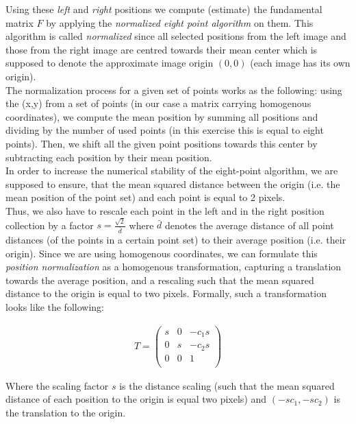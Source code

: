 \documentclass{paper}
\begin{document}
Using these \emph{left} and \emph{right} positions we compute (estimate) the fundamental matrix $F$ by applying the \emph{normalized eight point algorithm} on them. This algorithm is called \emph{normalized} since all selected positions from the left image and those from the right image are centred towards their mean center which is supposed to denote the approximate image origin $(0,0)$ (each image has its own origin). \\ 

The normalization process for a given set of points works as the following: using the (x,y) from a set of points (in our case a matrix carrying homogenous coordinates), we compute the mean position by summing all positions and dividing by the number of used points (in this exercise this is equal to eight points). Then, we shift all the given point positions towards this center by subtracting each position by their mean position. \\

In order to increase the numerical stability of the eight-point algorithm, we are supposed to ensure, that the mean squared distance between the origin (i.e. the mean position of the point set) and each point is equal to 2 pixels. \\

Thus, we also have to rescale each point in the left and in the right position collection by a factor $s = \frac{\sqrt{2}}{\bar{d}}$ where $\bar{d}$ denotes the average distance of all point distances (of the points in a certain point set) to their average position (i.e. their origin). Since we are using homogenous coordinates, we can formulate this \emph{position normalization} as a homogenous transformation, capturing a translation towards the average position, and a rescaling such that the mean squared distance to the origin is equal to two pixels. Formally, such a transformation looks like the following:

\begin{align*}
T = \left(\begin{array}{ccc}
s & 0 & -c_1 s \\
0 & s & -c_2 s \\
0 & 0 & 1 \\
\end{array} \right)
\end{align*}


Where the scaling factor $s$ is the distance scaling (such that the mean squared distance of each position to the origin is equal two pixels) and $(-s c_1, -s c_2)$ is the translation to the origin. \\
\end{document}
